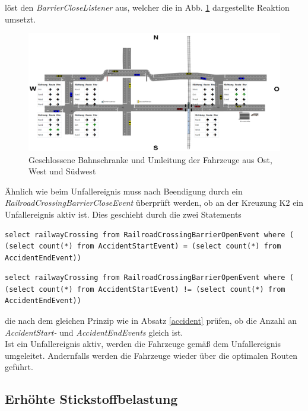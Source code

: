 löst den \textit{BarrierCloseListener} aus, welcher die in Abb. \ref{fig7} dargestellte Reaktion umsetzt.

\begin{figure}[ht]
	\includegraphics[width=\textwidth]{images/RailroadBarrierClose.png}
	\caption{Geschlossene Bahnschranke und Umleitung der Fahrzeuge aus Ost, West und Südwest}
	\label{fig7}
\end{figure}

Ähnlich wie beim Unfallereignis muss nach Beendigung durch ein \textit{RailroadCrossingBarrierCloseEvent} überprüft werden, ob an der Kreuzung K2 ein Unfallereignis aktiv ist. Dies geschieht durch die zwei Statements 

\begin{lstlisting}
select railwayCrossing from RailroadCrossingBarrierOpenEvent where ( (select count(*) from AccidentStartEvent) = (select count(*) from AccidentEndEvent))
\end{lstlisting}

\begin{lstlisting}
select railwayCrossing from RailroadCrossingBarrierOpenEvent where ( (select count(*) from AccidentStartEvent) != (select count(*) from AccidentEndEvent))
\end{lstlisting}

die nach dem gleichen Prinzip wie in Absatz \ref{accident} prüfen, ob die Anzahl an \textit{AccidentStart-} und \textit{AccidentEndEvents} gleich ist.\\
Ist ein Unfallereignis aktiv, werden die Fahrzeuge gemäß dem Unfallereignis umgeleitet. Andernfalls werden die Fahrzeuge wieder über die optimalen Routen geführt.


\subsection{Erhöhte Stickstoffbelastung}

